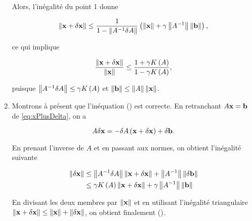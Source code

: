 \begin{enumerate}
  Alors, l'inégalité du point 1 donne 
  
  \begin{equation*}
    \left\lVert\mathbf{x} + \delta \mathbf{x}\right\rVert
    \leq \dfrac{1}{1 - \left\lVert A^{-1} \delta A\right\rVert} \left(\left\lVert\mathbf{x}\right\rVert + \gamma \left\lVert A^{-1}\right\rVert \left\lVert\mathbf{b}\right\rVert\right),
  \end{equation*}
  
  ce qui implique
  
  \begin{equation*}
    \dfrac{\left\lVert\mathbf{x} + \delta \mathbf{x}\right\rVert}{\left\lVert\mathbf{x}\right\rVert}
    \leq \dfrac{1 + \gamma K \left(A\right)}{1 - \gamma K \left(A\right)},
  \end{equation*}
  
  puisque $\left\lVert A^{-1} \delta A\right\rVert \leq \gamma K \left(A\right)$ et $\left\lVert\mathbf{b}\right\rVert \leq \left\lVert A\right\rVert \left\lVert\mathbf{x}\right\rVert$.
  
  \item Montrons à présent que l'inéquation () est correcte.
  En retranchant $A \mathbf{x} = \mathbf{b}$ de \eqref{eq:xPlusDelta}, on a 
  
  \begin{equation*}
    A \delta \mathbf{x} = - \delta A \left(\mathbf{x} + \delta \mathbf{x}\right) + \delta \mathbf{b}.
  \end{equation*}
  
  En prenant l'inverse de $A$ et en passant aux normes, on obtient l'inégalité suivante 
  
  \begin{equation*}
    \begin{split}
      \left\lVert\delta \mathbf{x}\right\rVert
      & \leq \left\lVert A^{-1} \delta A\right\rVert \left\lVert\mathbf{x} + \delta \mathbf{x}\right\rVert + \left\lVert A^{-1}\right\rVert \left\lVert\delta \mathbf{b}\right\rVert \\
      & \leq \gamma K \left(A\right) \left\lVert\mathbf{x} + \delta \mathbf{x}\right\rVert + \gamma \left\lVert A^{-1}\right\rVert \left\lVert\mathbf{b}\right\rVert
    \end{split}
  \end{equation*}
  
  En divisant les deux membres par $\left\lVert\mathbf{x}\right\rVert$ et en utilisant l'inégalité triangulaire $\left\lVert\mathbf{x} + \delta \mathbf{x}\right\rVert \leq \left\lVert\mathbf{x}\right\rVert + \left\lVert\delta \mathbf{x}\right\rVert$, on obtient finalement ().
  
  
\end{enumerate}
